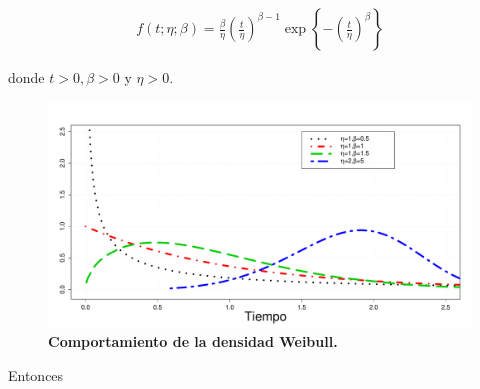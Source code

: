 \begin{eqnarray*}
f(t;\eta;\beta)=\frac{\beta}{\eta}\left(\frac{t}{\eta}\right)^{\beta-1}\exp\left\{-\left(\frac{t}{\eta}\right)^{\beta}\right\}
\end{eqnarray*}

\noindent donde $t>0,\beta>0$ y $\eta>0.$
\begin{figure}
\begin{center}
\includegraphics[scale=0.35]{weD.pdf}
\end{center}
\vspace{-1cm}\caption{\bf Comportamiento de la  densidad Weibull.}\label{wed}
\end{figure}

Entonces 


